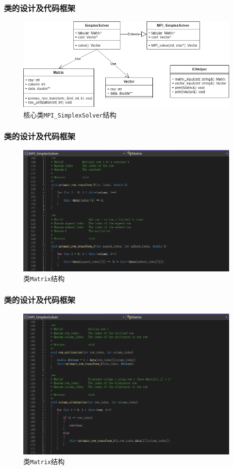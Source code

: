 \documentclass{beamer}
\begin{document}
\begin{frame}
    \frametitle{类的设计及代码框架}
    \begin{figure}[H]
        \centering
        \includegraphics[width=1\linewidth]{MPI_SimplexSolver.drawio.png}
        \caption{核心类\texttt{MPI\_SimplexSolver}结构}
    \end{figure}
\end{frame}

\begin{frame}
    \frametitle{类的设计及代码框架}
    \begin{figure}[H]
        \centering
        \includegraphics[width=1\linewidth]{Matrix1.png}
        \caption{类\texttt{Matrix}结构}
    \end{figure}
\end{frame}

\begin{frame}
    \frametitle{类的设计及代码框架}
    \begin{figure}[H]
        \centering
        \includegraphics[width=1\linewidth]{Matrix2.png}
        \caption{类\texttt{Matrix}结构}
    \end{figure}
\end{frame}
\end{document}
